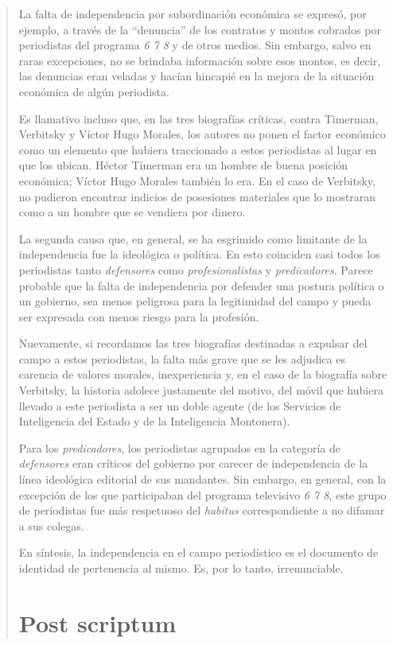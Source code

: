 \begin{quote}
La falta de independencia por subordinación económica se expresó, por ejemplo, a través de la ``denuncia'' de los contratos y montos cobrados por periodistas del programa \emph{6 7 8} y de otros medios. Sin embargo, salvo en raras excepciones, no se brindaba información sobre esos montos, es decir, las denuncias eran veladas y hacían hincapié en la mejora de la situación económica de algún periodista.

Es llamativo incluso que, en las tres biografías críticas, contra Timerman, Verbitsky y Víctor Hugo Morales, los autores no ponen el factor económico como un elemento que hubiera traccionado a estos periodistas al lugar en que los ubican. Héctor Timerman era un hombre de buena posición económica; Víctor Hugo Morales también lo era. En el caso de Verbitsky, no pudieron encontrar indicios de posesiones materiales que lo mostraran como a un hombre que se vendiera por dinero.

La segunda causa que, en general, se ha esgrimido como limitante de la independencia fue la ideológica o política. En esto coinciden casi todos los periodistas tanto \emph{defensores} como \emph{profesionalistas} y \emph{predicadores}. Parece probable que la falta de independencia por defender una postura política o un gobierno, sea menos peligrosa para la legitimidad del campo y pueda ser expresada con menos riesgo para la profesión.

Nuevamente, si recordamos las tres biografías destinadas a expulsar del campo a estos periodistas, la falta más grave que se les adjudica es carencia de valores morales, inexperiencia y, en el caso de la biografía sobre Verbitsky, la historia adolece justamente del motivo, del móvil que hubiera llevado a este periodista a ser un doble agente (de los Servicios de Inteligencia del Estado y de la Inteligencia Montonera).

Para los \emph{predicadores}, los periodistas agrupados en la categoría de \emph{defensores} eran críticos del gobierno por carecer de independencia de la línea ideológica editorial de sus mandantes. Sin embargo, en general, con la excepción de los que participaban del programa televisivo \emph{6 7 8}, este grupo de periodistas fue más respetuoso del \emph{habitus} correspondiente a no difamar a sus colegas.

En síntesis, la independencia en el campo periodístico es el documento de identidad de pertenencia al mismo. Es, por lo tanto, irrenunciable.

\chapter {Post scriptum}


\end{quote}
